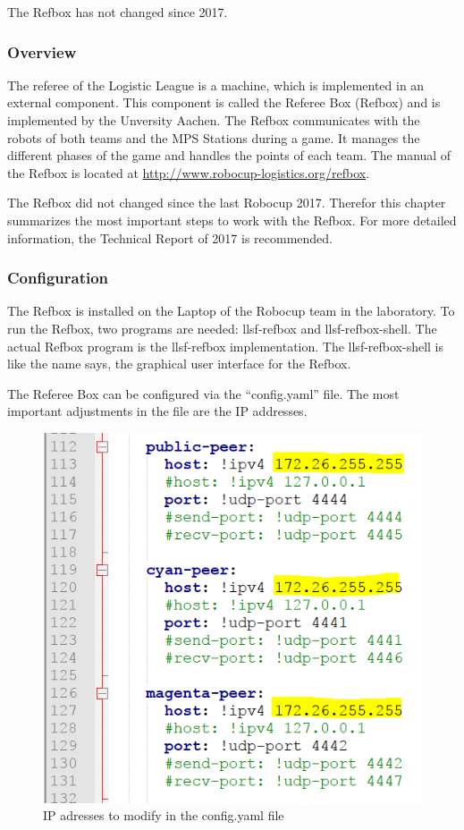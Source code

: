 The Refbox has not changed since 2017. 


\subsubsection{Overview}

The referee of the Logistic League is a machine, which is implemented in an external component. This component is called the Referee Box (Refbox) and is implemented by the Unversity Aachen. The Refbox communicates with the robots of both teams and the MPS Stations during a game. It manages the different phases of the game and handles the points of each team. The manual of the Refbox is located at  \url{http://www.robocup-logistics.org/refbox}.

The Refbox did not changed since the last Robocup 2017. Therefor this chapter summarizes the most important steps to work with the Refbox. For more detailed information, the Technical Report of 2017 is recommended.


\subsubsection{Configuration}

The Refbox is installed on the Laptop of the Robocup team in the laboratory. To run the Refbox, two programs are needed: llsf-refbox and llsf-refbox-shell. The actual Refbox program is the llsf-refbox implementation. The llsf-refbox-shell is like the name says, the graphical user interface for the Refbox.

The Referee Box can be configured via the “config.yaml” file. The most important adjustments in the file are the IP addresses. 
 
 \begin{figure}[!h]
\centering
\includegraphics[]{pic/config_file_1.png}
\caption{IP adresses to modify in the config.yaml file}
\label{fig:configFile1}
\end{figure}


